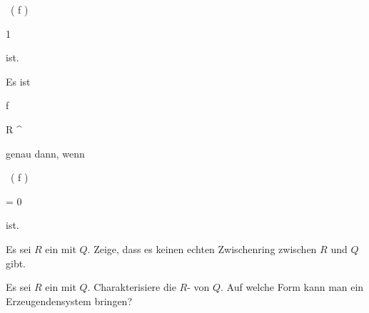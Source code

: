 {{{\vergleichskette

{  \,  \left(   f   \right)
}

{ \geq }{ 1
}

{  }{
}

{    }{
}

{   }{
}

}
{}{}{}
ist.
}{Es ist


\mavergleichskette

{\vergleichskette

{f
}

{ \in }{ R ^{\times}
}

{  }{
}

{    }{
}

{   }{
}

}
{}{}{}
genau dann, wenn


\mavergleichskette

{\vergleichskette

{  \,  \left(   f   \right)
}

{ = }{ 0
}

{  }{
}

{    }{
}

{   }{
}

}
{}{}{}
ist.
}


}

{} {}



{}

{


Es sei $R$ ein
mit
$Q$. Zeige, dass es keinen echten Zwischenring zwischen $R$ und $Q$ gibt.


}

{} {}



{}

{


Es sei $R$ ein
mit
$Q$. Charakterisiere die
$R$-
von $Q$. Auf welche Form kann man ein Erzeugendensystem bringen?


}

{} {}



{}

